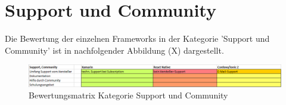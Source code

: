 \section{Support und Community}

Die Bewertung der einzelnen Frameworks in der Kategorie 'Support und Community' ist in nachfolgender Abbildung (X) dargestellt.

\begin{figure}[h]
	\centering
	\includegraphics[width=1\textwidth]{Bilder/Auswertung_SupportCommunity.PNG}
	\caption{Bewertungsmatrix Kategorie Support und Community}
	\label{fig:AuswSuppComm}
\end{figure}


